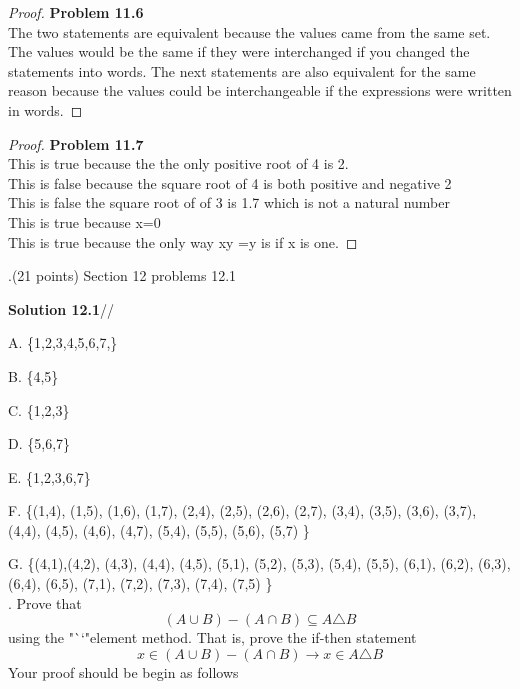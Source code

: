 \documentclass[12pt]{article}
\begin{document}
\begin{proof}
\textbf{Problem 11.6}\\
The two statements are equivalent because the values came from the same set. The values would be the same if they were interchanged if you changed the statements into words. The next statements are also equivalent for the same reason because the values could be interchangeable if the expressions were written in words.

\end{proof}

\begin{proof}
\textbf{Problem 11.7}\\
 This is true because the the only positive root of 4 is 2.\\
 This is false because the square root of 4 is both positive and negative 2\\
 This is false the square root of of 3 is 1.7 which is not a natural number\\
 This is true because x=0  \\
 This is true because the only way xy =y is if x is one. 

\end{proof}

.(21 points)  Section 12 problems 12.1
\vspace{.15in}

\textbf{Solution 12.1}//
\item A. \{1,2,3,4,5,6,7,\}
\item B. \{4,5\}
\item C. \{1,2,3\}
\item D. \{5,6,7\}
\item E. \{1,2,3,6,7\}
\item F. \{(1,4), (1,5), (1,6), (1,7), (2,4), (2,5), (2,6), (2,7), (3,4), (3,5), (3,6), (3,7), (4,4), (4,5), (4,6), (4,7), (5,4), (5,5), (5,6), (5,7) \}
\item G. \{(4,1),(4,2), (4,3), (4,4), (4,5), (5,1), (5,2), (5,3), (5,4), (5,5), (6,1), (6,2), (6,3), (6,4), (6,5), (7,1), (7,2), (7,3), (7,4), (7,5) \} \\ 




.  Prove that 
\[
(A \cup B) - (A \cap B) \subseteq A \triangle B
\]
using the "``"element method.  That is, prove the if-then statement 
\[
x \in (A \cup B) - (A \cap B) \longrightarrow x \in A \triangle B
\]
Your proof should be begin as follows 
\vspace{.15in}
\end{document}
